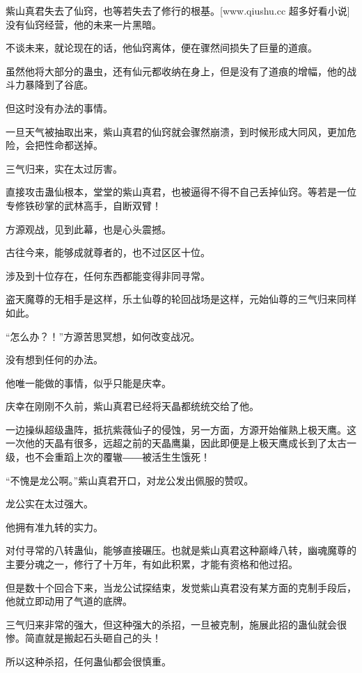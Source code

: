 
\begin{this_body}

紫山真君失去了仙窍，也等若失去了修行的根基。[www.qiushu.cc 超多好看小说]没有仙窍经营，他的未来一片黑暗。

不谈未来，就论现在的话，他仙窍离体，便在骤然间损失了巨量的道痕。

虽然他将大部分的蛊虫，还有仙元都收纳在身上，但是没有了道痕的增幅，他的战斗力暴降到了谷底。

但这时没有办法的事情。

一旦天气被抽取出来，紫山真君的仙窍就会骤然崩溃，到时候形成大同风，更加危险，会把性命都送掉。

三气归来，实在太过厉害。

直接攻击蛊仙根本，堂堂的紫山真君，也被逼得不得不自己丢掉仙窍。等若是一位专修铁砂掌的武林高手，自断双臂！

方源观战，见到此幕，也是心头震撼。

古往今来，能够成就尊者的，也不过区区十位。

涉及到十位存在，任何东西都能变得非同寻常。

盗天魔尊的无相手是这样，乐土仙尊的轮回战场是这样，元始仙尊的三气归来同样如此。

“怎么办？！”方源苦思冥想，如何改变战况。

没有想到任何的办法。

他唯一能做的事情，似乎只能是庆幸。

庆幸在刚刚不久前，紫山真君已经将天晶都统统交给了他。

一边操纵超级蛊阵，抵抗紫薇仙子的侵蚀，另一方面，方源开始催熟上极天鹰。这一次他的天晶有很多，远超之前的天晶鹰巢，因此即便是上极天鹰成长到了太古一级，也不会重蹈上次的覆辙――被活生生饿死！

“不愧是龙公啊。”紫山真君开口，对龙公发出佩服的赞叹。

龙公实在太过强大。

他拥有准九转的实力。

对付寻常的八转蛊仙，能够直接碾压。也就是紫山真君这种巅峰八转，幽魂魔尊的主要分魂之一，修行了十万年，有如此积累，才能有资格和他过招。

但是数十个回合下来，当龙公试探结束，发觉紫山真君没有某方面的克制手段后，他就立即动用了气道的底牌。

三气归来非常的强大，但这种强大的杀招，一旦被克制，施展此招的蛊仙就会很惨。简直就是搬起石头砸自己的头！

所以这种杀招，任何蛊仙都会很慎重。


\end{this_body}
